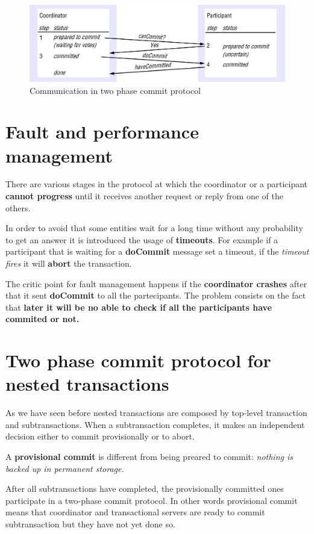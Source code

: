 \begin{figure}[!h]
    \centering
    \includegraphics[width=.80\linewidth]{images/DistributedTransactions/twoPhaseCommunication.png}
    \caption{Communication in two phase commit protocol}
\end{figure}

\section{Fault and performance management}
There are various stages in the protocol at which the coordinator or a participant \textbf{cannot progress} until it receives another request or reply from one of the others.

In order to avoid that some entities wait for a long time without any probability to get an answer it is introduced the usage of \textbf{timeouts}. For example if a participant that is waiting for a \textbf{doCommit} message set a timeout, if the \textit{timeout fires} it will \textbf{abort} the transaction.

The critic point for fault management happens if the \textbf{coordinator crashes} after that it sent \textbf{doCommit} to all the partecipants. The problem consists on the fact that \textbf{later it will be no able to check if all the participants have commited or not.}


\section{Two phase commit protocol for nested transactions}
As we have seen before nested transactions are composed by top-level transaction and subtransactions. When a subtransaction completes, it makes an independent decision either to commit provisionally or to abort.

A \textbf{provisional commit} is different from being preared to commit: \textit{nothing is backed up in permanent storage.}

After all subtransactions have completed, the provisionally committed ones participate in a two-phase commit protocol. In other words provisional commit means that coordinator and transactional servers are ready to commit subtransaction but they have not yet done so.

